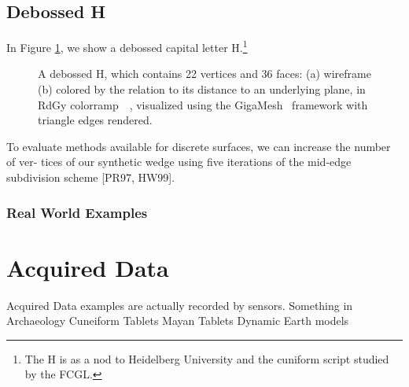 \documentclass[openany]{book}
\begin{document}
\subsection{Debossed H}
In Figure \ref{fig:h}, we show a debossed capital letter H.\footnote{The H is as a nod to Heidelberg University and the cuniform script studied by the FCGL.}
\begin{figure}[ht]
\centering
\subfloat[wireframe]{
  \resizebox{0.48\linewidth}{!}{}
  \label{fig:h.a}}
\caption[A debossed H, which contains 22 vertices and 36 faces.]{A debossed H, which contains 22 vertices and 36 faces: (a) wireframe (b) colored by the relation to its distance to an underlying plane, in RdGy colorramp~\cite[p.~???]{Brewer2003}~\cite[p.~19]{Giga17}, visualized using the GigaMesh~\cite{Mara10} framework with triangle edges rendered.}\label{fig:h}
\end{figure}
To evaluate methods available for discrete surfaces, we can increase the number of ver-
tices of our synthetic wedge using five iterations of the mid-edge subdivision scheme [PR97,
HW99].~\cite[p.~38]{Mara12}
	\subsubsection{Real World Examples}



\section{Acquired Data}
Acquired Data examples are actually recorded by sensors.
Something in Archaeology
Cuneiform Tablets
Mayan Tablets
Dynamic Earth models
\end{document}

